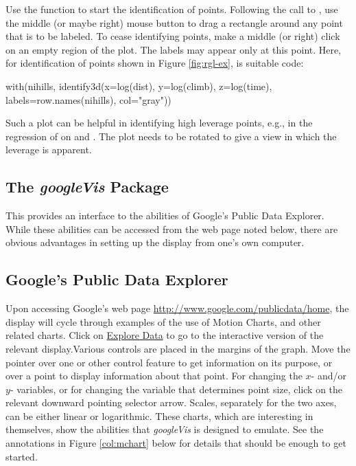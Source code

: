 Use the function  to start the identification of
points.  Following the call to , use the middle (or
maybe right) mouse button to drag a rectangle around any point that is
to be labeled.  To cease identifying points, make a middle (or right)
click on an empty region of the plot.  The labels may appear only at
this point.  Here, for identification of points shown in Figure
\ref{fig:rgl-ex}, is suitable code:
\begin{Schunk}
\begin{Sinput}
with(nihills, identify3d(x=log(dist), y=log(climb),
                         z=log(time),
                         labels=row.names(nihills),
                         col="gray"))
\end{Sinput}
\end{Schunk}

Such a plot can be helpful in identifying high leverage points,
e.g., in the regression of  on 
and .  The plot needs to be rotated to give a view
in which the leverage is apparent.

\subsection{The {\em googleVis} Package}\label{sec:gvis}

This provides an interface to the abilities of Google's Public Data
Explorer.  While these abilities can be accessed from the web page
noted below, there are obvious advantages in setting up the display
from one's own computer.

\subsection*{Google's Public Data Explorer}

Upon accessing Google's web page
\url{http://www.google.com/publicdata/home}, the display will cycle
through examples of the use of Motion Charts, and other related
charts.  Click on \underline{Explore Data} to go to the interactive
version of the relevant display.Various controls are placed
  in the margins of the graph.  Move the pointer over one or other
  control feature to get information on its purpose, or over a point
  to display information about that point. For changing the $x$-
  and/or $y$- variables, or for changing the variable that determines
  point size, click on the relevant downward pointing selector arrow.
  Scales, separately for the two axes, can be either linear or
  logarithmic.  These charts, which are interesting in themselves,
show the abilities that {\em googleVis} is designed to emulate.  See
the annotations in Figure \ref{col:mchart} below for details that
should be enough to get started.

